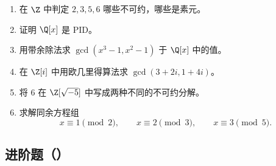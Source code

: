 \begin{enumerate}[label=\textbf{9.\arabic*}, leftmargin=*]
  \item \basic 在 $\Z$ 中判定 $2,3,5,6$ 哪些不可约，哪些是素元。
  \item \basic 证明 $\Q[x]$ 是 PID。
  \item \basic 用带余除法求 $\gcd(x^3-1,x^2-1)$ 于 $\Q[x]$ 中的值。
  \item \basic 在 $\Z[i]$ 中用欧几里得算法求 $\gcd(3+2i,1+4i)$。
  \item \basic 将 $6$ 在 $\Z[\sqrt{-5}]$ 中写成两种不同的不可约分解。
  \item \basic 求解同余方程组
  \[
  x\equiv 1\pmod 2,
  \qquad
  x\equiv 2\pmod 3,
  \qquad
  x\equiv 3\pmod 5.
  \]
\end{enumerate}

\subsection*{进阶题（\medium）}


